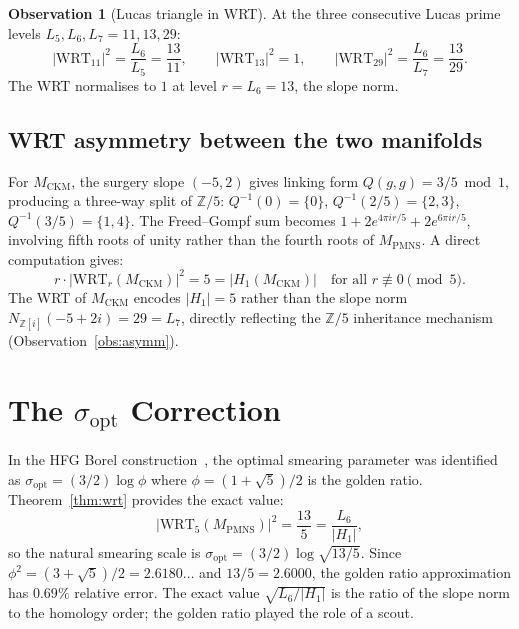 \documentclass[11pt,a4paper]{article}
\theoremstyle{definition}
\newtheorem{observation}[theorem]{Observation}
\theoremstyle{remark}
\newcommand{\MPMNS}{M_{\mathrm{PMNS}}}
\newcommand{\MCKM}{M_{\mathrm{CKM}}}
\newcommand{\Zfive}{\mathbb{Z}/5}
\newcommand{\Zi}{\mathbb{Z}[i]}
\newcommand{\WRT}{\mathrm{WRT}}
\begin{document}
\begin{observation}[Lucas triangle in WRT]
\label{obs:lucas}
At the three consecutive Lucas prime levels $L_5, L_6, L_7 = 11, 13, 29$:
\begin{equation}
|\WRT_{11}|^2 = \frac{L_6}{L_5} = \frac{13}{11}, \qquad
|\WRT_{13}|^2 = 1, \qquad
|\WRT_{29}|^2 = \frac{L_6}{L_7} = \frac{13}{29}.
\end{equation}
The WRT normalises to $1$ at level $r = L_6 = 13$, the slope norm.
\end{observation}

\subsection{WRT asymmetry between the two manifolds}

For $\MCKM$, the surgery slope $(-5,2)$ gives linking form
$Q(g,g) = 3/5 \bmod 1$, producing a three-way split of $\Zfive$:
$Q^{-1}(0) = \{0\}$, $Q^{-1}(2/5) = \{2,3\}$, $Q^{-1}(3/5) = \{1,4\}$.
The Freed--Gompf sum becomes $1 + 2e^{4\pi i r/5} + 2e^{6\pi i r/5}$,
involving fifth roots of unity rather than the fourth roots of $\MPMNS$.
A direct computation gives:
\begin{equation}
r \cdot |\WRT_r(\MCKM)|^2 = 5 = |H_1(\MCKM)|
\quad \text{for all } r \not\equiv 0\pmod{5}.
\end{equation}
The WRT of $\MCKM$ encodes $|H_1| = 5$ rather than the slope norm
$N_{\Zi}(-5+2i) = 29 = L_7$, directly reflecting the $\Zfive$
inheritance mechanism (Observation~\ref{obs:asymm}).

\section{The $\sigma_\mathrm{opt}$ Correction}
\label{sec:sigma}

In the HFG Borel construction~\cite{Gentry:Unified}, the optimal
smearing parameter was identified as $\sigma_\mathrm{opt} = (3/2)\log\phi$
where $\phi = (1+\sqrt{5})/2$ is the golden ratio.
Theorem~\ref{thm:wrt} provides the exact value:
\begin{equation}
|\WRT_5(\MPMNS)|^2 = \frac{13}{5} = \frac{L_6}{|H_1|},
\end{equation}
so the natural smearing scale is $\sigma_\mathrm{opt} = (3/2)\log\sqrt{13/5}$.
Since $\phi^2 = (3+\sqrt{5})/2 = 2.6180\ldots$ and $13/5 = 2.6000$,
the golden ratio approximation has $0.69\%$ relative error.
The exact value $\sqrt{L_6/|H_1|}$ is the ratio of the slope norm
to the homology order; the golden ratio played the role of a scout.
\end{document}
